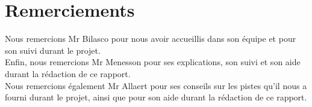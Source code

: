 \section*{Remerciements}

Nous remercions Mr Bilasco pour nous avoir accueillis dans son équipe et pour son 
suivi durant le projet.\\

Enfin, nous remercions Mr Menesson pour ses explications, son suivi et son aide 
durant la rédaction de ce rapport.\\

Nous remercions également Mr Allaert pour ses conseils sur les pistes qu'il nous
a fourni durant le projet, ainsi que pour son aide durant la rédaction de ce rapport.
\newpage